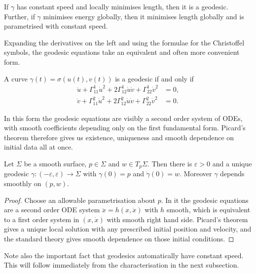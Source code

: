 \documentclass[a4paper]{scrartcl}
\begin{document}
\begin{corollary}
    If $\gamma$ has constant speed and locally minimises length, then it is a geodesic. Further, if $\gamma$ minimises energy globally, then it minimises length globally and is parametrised with constant speed.
\end{corollary}

Expanding the derivatives on the left and using the formulae for the Christoffel symbols, the geodesic equations take an equivalent and often more convenient form.

\begin{corollary}
    A curve $\gamma(t) = \sigma(u(t), v(t))$ is a geodesic if and only if
    \begin{align*}
        \ddot u + \Gamma^1_{11}\dot u^2 + 2\Gamma^1_{12}\dot u \dot v + \Gamma^1_{22}\dot v^2 &= 0, \\
        \ddot v + \Gamma^2_{11}\dot u^2 + 2\Gamma^2_{12}\dot u \dot v + \Gamma^2_{22}\dot v^2 &= 0.
    \end{align*}
\end{corollary}

In this form the geodesic equations are visibly a second order system of ODEs, with smooth coefficients depending only on the first fundamental form. Picard's theorem therefore gives us existence, uniqueness and smooth dependence on initial data all at once.

\begin{proposition}
    Let $\Sigma$ be a smooth surface, $p \in \Sigma$ and $w \in T_p\Sigma$. Then there is $\varepsilon > 0$ and a unique geodesic $\gamma: (-\varepsilon,\varepsilon) \rightarrow \Sigma$ with $\gamma(0) = p$ and $\dot\gamma(0) = w$. Moreover $\gamma$ depends smoothly on $(p, w)$.
\end{proposition}
\begin{proof}
    Choose an allowable parametrisation about $p$. In it the geodesic equations are a second order ODE system $\ddot x = h(x, \dot x)$ with $h$ smooth, which is equivalent to a first order system in $(x, \dot x)$ with smooth right hand side. Picard's theorem gives a unique local solution with any prescribed initial position and velocity, and the standard theory gives smooth dependence on those initial conditions.
\end{proof}

Note also the important fact that geodesics automatically have constant speed. This will follow immediately from the characterisation in the next subsection.
\end{document}
